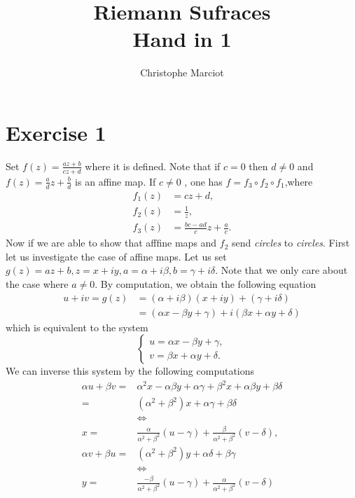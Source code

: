 \documentclass[11pt, a4paper, twoside]{article}
\begin{document}
\title{Riemann Sufraces\\ Hand in 1}
\author{Christophe Marciot}
\maketitle

\section*{Exercise 1}
	Set $f(z)=\frac{az+b}{cz+d}$  where it is defined. Note that if $c=0$ then $d\neq0$ and $f(z)=\frac{a}{d}z+\frac{b}{d}$ is an affine map. If $c\neq0$ , one has $f=f_3\circ f_2\circ f_1$,where
		\begin{align*}
			f_1(z)&=cz+d,\\
			f_2(z)&=\frac{1}{z},\\
			f_3(z)&=\frac{bc-ad}{c}z+\frac{a}{c}.
		\end{align*}
	Now if we are able to show that afffine maps and $f_2$ send \emph{circles} to \emph{circles}. First let us investigate the case of affine maps. Let us set $g(z)=az+b,z=x+iy,a=\alpha+i\beta,b=\gamma+i\delta$. Note that we only care about the case where $a\neq0$. By computation, we obtain the following equation
		\begin{align*}
			u+iv=g(z)&=(\alpha+i\beta)(x+iy)+(\gamma+i\delta)\\
				        &=(\alpha x- \beta y +\gamma)+i(\beta x+\alpha y +\delta)
		\end{align*}
	which is equivalent to the system 
		$$\begin{cases}
			u=\alpha x-\beta y+\gamma,\\
			v=\beta x+\alpha y+\delta.
		\end{cases}$$
	We can inverse this system by the following computations 
		\begin{align*}
			\alpha u +\beta v=&\alpha^2x-\alpha\beta y+\alpha\gamma+\beta^2x+\alpha\beta y+\beta\delta\\
						      =&(\alpha^2+\beta^2)x+\alpha\gamma+\beta\delta\\
			&\iff\\
			x 				=& \frac{\alpha}{\alpha^2+\beta^2}(u-\gamma)+\frac{\beta}{\alpha^2+\beta^2}(v-\delta),\\
			\alpha v+\beta u =& (\alpha^2+\beta^2)y+\alpha\delta+\beta\gamma\\
			&\iff\\
			y				=& \frac{-\beta}{\alpha^2+\beta^2}(u-\gamma)+\frac{\alpha}{\alpha^2+\beta^2}(v-\delta)
		\end{align*}
\end{document}
